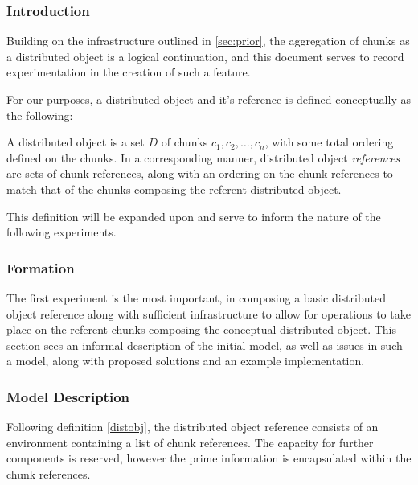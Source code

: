 \subsubsection{Introduction}

Building on the infrastructure outlined in \ref{sec:prior}, the aggregation of chunks as a distributed object
is a logical continuation, and this document serves to record experimentation
in the creation of such a feature.

For our purposes, a distributed object and it's reference is defined
conceptually as the following:

\begin{definition}
	\label{distobj}
	A distributed object is a set \(D\) of chunks \(c_1, c_2, \dots, c_n\),
	with some total ordering defined on the chunks. 
	In a corresponding manner, distributed object \textit{references} are
	sets of chunk references, along with an ordering on the chunk
	references to match that of the chunks composing the referent
	distributed object.
\end{definition}

This definition will be expanded upon and serve to inform the nature of the
following experiments.

\subsubsection{Formation}

The first experiment is the most important, in composing a basic distributed
object reference along with sufficient infrastructure to allow for operations
to take place on the referent chunks composing the conceptual distributed
object.
This section sees an informal description of the initial model, as well as
issues in such a model, along with proposed solutions and an example
implementation.

\subsubsection{Model Description}

Following definition \cref{distobj}, the distributed
object reference consists of an environment containing a list of chunk
references.
The capacity for further components is reserved, however the prime information
is encapsulated within the chunk references.

